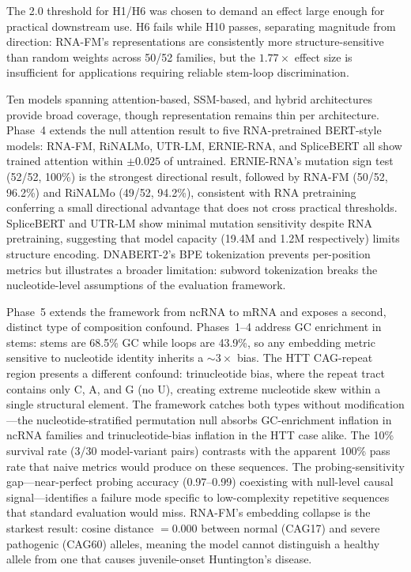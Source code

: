 \documentclass[11pt]{article}
\begin{document}
The 2.0 threshold for H1/H6 was chosen to demand an effect large
enough for practical downstream use.  H6 fails while H10 passes,
separating magnitude from direction: RNA-FM's representations are
consistently more structure-sensitive than random weights across
50/52 families, but the $1.77\times$ effect size is insufficient for
applications requiring reliable stem-loop discrimination.

Ten models spanning attention-based, SSM-based, and hybrid
architectures provide broad coverage, though representation remains
thin per architecture.  Phase~4 extends the null attention result to
five RNA-pretrained BERT-style models: RNA-FM, RiNALMo, UTR-LM,
ERNIE-RNA, and SpliceBERT all show trained attention within $\pm
0.025$ of untrained.  ERNIE-RNA's mutation sign test (52/52, 100\%)
is the strongest directional result, followed by RNA-FM (50/52,
96.2\%) and RiNALMo (49/52, 94.2\%), consistent with RNA pretraining
conferring a small directional advantage that does not cross practical
thresholds.  SpliceBERT and UTR-LM show minimal mutation sensitivity
despite RNA pretraining, suggesting that model capacity (19.4M and
1.2M respectively) limits structure encoding.  DNABERT-2's BPE
tokenization prevents per-position metrics but illustrates a broader
limitation: subword tokenization breaks the nucleotide-level
assumptions of the evaluation framework.

Phase~5 extends the framework from ncRNA to mRNA and exposes a second,
distinct type of composition confound.  Phases~1--4 address GC
enrichment in stems: stems are 68.5\% GC while loops are 43.9\%, so
any embedding metric sensitive to nucleotide identity inherits a
${\sim}3\times$ bias.  The HTT CAG-repeat region presents a different
confound: trinucleotide bias, where the repeat tract contains only C,
A, and G (no U), creating extreme nucleotide skew within a single
structural element.  The framework catches both types without
modification---the nucleotide-stratified permutation null absorbs
GC-enrichment inflation in ncRNA families and trinucleotide-bias
inflation in the HTT case alike.  The 10\% survival rate (3/30
model-variant pairs) contrasts with the apparent 100\% pass rate that
naive metrics would produce on these sequences.  The
probing-sensitivity gap---near-perfect probing accuracy (0.97--0.99)
coexisting with null-level causal signal---identifies a failure mode
specific to low-complexity repetitive sequences that standard
evaluation would miss.  RNA-FM's embedding collapse is the starkest
result: cosine distance $= 0.000$ between normal (CAG17) and severe
pathogenic (CAG60) alleles, meaning the model cannot distinguish a
healthy allele from one that causes juvenile-onset Huntington's
disease.
\end{document}
